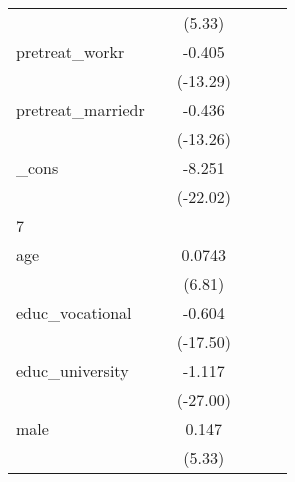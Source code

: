 {\begin{tabular}{l*{5}{c}}
            &                     &      (5.33)         &                     &                     &                     \\
[1em]
pretreat\_workr&                     &      -0.405\sym{***}&                     &                     &                     \\
            &                     &    (-13.29)         &                     &                     &                     \\
[1em]
pretreat\_marriedr&                     &      -0.436\sym{***}&                     &                     &                     \\
            &                     &    (-13.26)         &                     &                     &                     \\
[1em]
\_cons      &                     &      -8.251\sym{***}&                     &                     &                     \\
            &                     &    (-22.02)         &                     &                     &                     \\
\hline
7           &                     &                     &                     &                     &                     \\
age         &                     &      0.0743\sym{***}&                     &                     &                     \\
            &                     &      (6.81)         &                     &                     &                     \\
[1em]
educ\_vocational&                     &      -0.604\sym{***}&                     &                     &                     \\
            &                     &    (-17.50)         &                     &                     &                     \\
[1em]
educ\_university&                     &      -1.117\sym{***}&                     &                     &                     \\
            &                     &    (-27.00)         &                     &                     &                     \\
[1em]
male        &                     &       0.147\sym{***}&                     &                     &                     \\
            &                     &      (5.33)         &                     &                     &                     \\

\end{tabular}}
